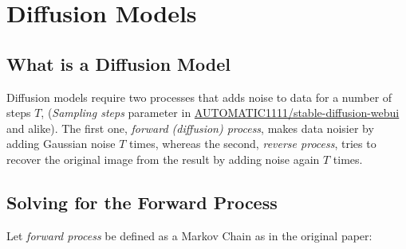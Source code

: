\documentclass{article}
\numberwithin{equation}{subsection}
\begin{document}
\section{Diffusion Models}
\subsection{What is a Diffusion Model}

Diffusion models require two processes that adds noise to data for a number of steps $T$, (\textit{Sampling steps} parameter in \href{https://github.com/AUTOMATIC1111/stable-diffusion-webui}{AUTOMATIC1111/stable-diffusion-webui} and alike). The first one, \textit{forward (diffusion) process}, makes data noisier by adding Gaussian noise $T$ times, whereas the second, \textit{reverse process}, tries to recover the original image from the result by adding noise again $T$ times. 
\subsection{Solving for the Forward Process}
Let \textit{forward process} be defined as a Markov Chain as in the original paper:
\end{document}
